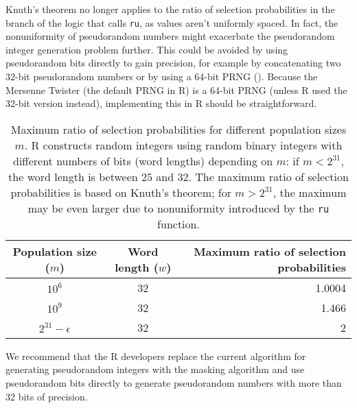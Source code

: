 \documentclass[12pt]{article}
\begin{document}
Knuth's theorem no longer applies to the ratio of selection probabilities in the branch of the 
logic that calls \texttt{ru}, as values aren't uniformly spaced.
In fact, the nonuniformity of pseudorandom numbers might exacerbate the pseudorandom integer generation problem further.
This could be avoided by using pseudorandom bits directly to gain precision, for example by
concatenating two 32-bit pseudorandom numbers or by using a 64-bit PRNG 
(\cite{marsaglia_64bit_2004}).
Because the Mersenne Twister (the default PRNG in R) is a 64-bit PRNG (unless R used the 32-bit version instead), implementing this in R should
be straightforward.

\begin{table}[h]
\caption{Maximum ratio of selection probabilities for different population sizes $m$. 
  R constructs random integers using random binary integers with different numbers of bits (word lengths) depending on $m$:
  if $m < 2^{31}$, the word length is between $25$ and $32$.
  The maximum ratio of selection probabilities is based on Knuth's theorem; 
  for $m > 2^{31}$, the maximum may be even larger due to nonuniformity introduced by the \texttt{ru} function.
}
\begin{center}
\begin{tabular}{|c|c|r|}

\hline
Population size ($m$) & Word length ($w$) & Maximum ratio of selection probabilities\\
\hline 
$10^6$ & 32 & 1.0004 \\
$10^9$ & 32 & 1.466 \\
 $2^{31}-\epsilon$ & 32 & 2 \\
\hline

\end{tabular}
\end{center}
\label{tab}
\end{table}%

We recommend that the R developers replace the current algorithm for generating pseudorandom integers with the masking algorithm
and use pseudorandom bits directly to generate pseudorandom numbers with more than 32 bits of precision.



\end{document}
